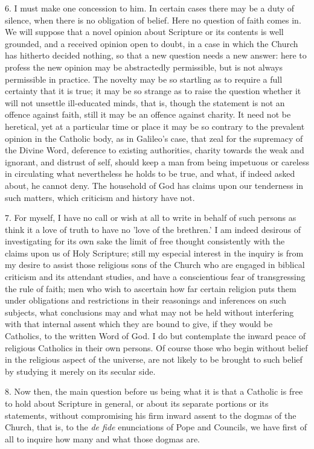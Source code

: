 6. I must make one concession to him. In certain
cases there may be a duty of silence, when there is no obligation of
belief. Here no question of faith comes in. We will suppose that a
novel opinion about Scripture or its contents is well grounded, and a
received opinion open to doubt, in a case in which the Church has
hitherto decided nothing, so that a new question needs a new answer:
here to profess the new opinion may be abstractedly permissible, but
is not always permissible in practice. The novelty may be so startling
as to require a full certainty that it is true; it may be so strange
as to raise the question whether it will not unsettle ill-educated
minds, that is, though the statement is not an offence against faith,
still it may be an offence against charity. It need not be heretical,
yet at a particular time or place it may be so contrary to the
prevalent opinion in the Catholic body, as in Galileo's case, that
zeal for the supremacy of the Divine Word, deference to existing
authorities, charity towards the weak and ignorant, and distrust of
self, should keep a man from being impetuous or careless in
circulating what nevertheless he holds to be true, and what, if indeed
asked about, he cannot deny. The household of God has claims upon our
tenderness in such matters, which criticism and history have not.

7. For myself, I have no call or wish at all to
write in behalf of such persons as think it a love of truth to have no
'love of the brethren.' I am indeed desirous of investigating for its
own sake the limit of free thought consistently with the claims upon
us of Holy Scripture; still my especial interest in the inquiry is
from my desire to assist those religious sons of the Church who are
engaged in biblical criticism and its attendant studies, and have a
conscientious fear of transgressing the rule of faith; men who wish to
ascertain how far certain religion puts them under obligations and
restrictions in their reasonings and inferences on such subjects, what
conclusions may and what may not be held without interfering with that
internal assent which they are bound to give, if they would be
Catholics, to the written Word of God. I do but contemplate the inward
peace of religious Catholics in their own persons. Of course those who
begin without belief in the religious aspect of the universe, are not
likely to be brought to such belief by studying it merely on its
secular side.

8. Now then, the main question before us being
what it is that a Catholic is free to hold about Scripture in general,
or about its separate portions or its statements, without compromising
his firm inward assent to the dogmas of the Church, that is, to the \emph{de
fide} enunciations of Pope and Councils, we have first of all to
inquire how many and what those dogmas are.

